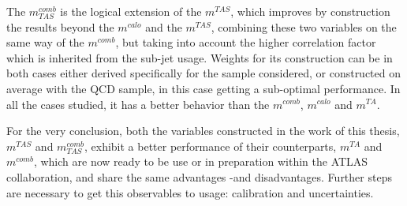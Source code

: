\documentclass[UKenglish,texlive=2013]{\ATLASLATEXPATH atlasdoc}
\newcommand{\mta}{m^{TA}}
\newcommand{\mtas}{m^{TAS}}
\newcommand{\mcal}{m^{calo}}
\newcommand{\mcomb}{m^{comb}}
\newcommand{\mcombtas}{m^{comb}_{TAS}}
\begin{document}
The $\mcombtas$ is the logical extension of the $\mtas$, which improves by construction the results beyond the $\mcal$ and the $\mtas$, combining these two variables on the same way of the $\mcomb$, but taking into account the higher correlation factor which is inherited from the sub-jet usage.
Weights for its construction can be in both cases either derived specifically for the sample considered, or constructed on average with the QCD sample, in this case getting a sub-optimal performance. 
In all the cases studied, it has a better behavior than the $\mcomb$, $\mcal$ and $\mta$.

For the very conclusion, both the variables constructed in the work of this thesis,$\mtas$ and $\mcombtas$, exhibit a better performance of their counterparts, $\mta$ and $\mcomb$, which are now ready to be use or in preparation within the ATLAS collaboration, and share the same advantages -and disadvantages. Further steps are necessary to get this observables to usage: calibration and uncertainties.




\end{document}
